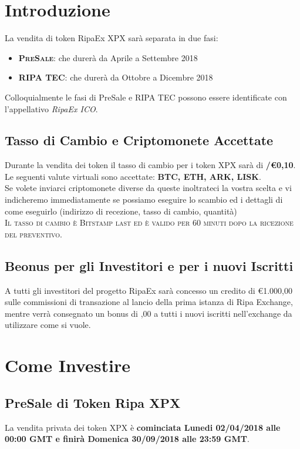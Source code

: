 \documentclass[11pt,fleqn]{book} %
\begin{document}
\section{Introduzione}
La vendita di token RipaEx XPX sarà separata in due fasi:
	\begin{itemize}
		\item \textbf{\textsc{PreSale}}: che durerà da Aprile a Settembre 2018
		\item \textbf{\textsc{RIPA TEC}}: che durerà da Ottobre a Dicembre 2018
	\end{itemize}
\vspace{5mm}
Colloquialmente le fasi di PreSale e RIPA TEC possono essere identificate con l'appellativo \textit{RipaEx ICO}.

\subsection{Tasso di Cambio e Criptomonete Accettate}
Durante la vendita dei token il tasso di cambio per i token XPX sarà di \textbf{\PHP/\euro0,10}.\\

Le seguenti valute virtuali sono accettate: \textbf{BTC, ETH, ARK, LISK}.\\

Se volete inviarci criptomonete diverse da queste inoltrateci la vostra scelta e vi indicheremo immediatamente
se possiamo eseguire lo scambio ed i dettagli di come eseguirlo (indirizzo di recezione, tasso di cambio,
quantità)\\

\textsc{Il tasso di cambio è Bitstamp last ed è valido per 60 minuti dopo la ricezione del preventivo}.

\subsection{Beonus per gli Investitori e per i nuovi Iscritti}
A tutti gli investitori del progetto RipaEx sarà concesso un credito di \euro1.000,00 sulle commissioni
di transazione al lancio della prima istanza di Ripa Exchange, mentre verrà consegnato un bonus di ,00
a tutti i nuovi iscritti nell'exchange da utilizzare come si vuole.


\section{Come Investire}
\subsection{PreSale di Token Ripa XPX}
La vendita privata dei token XPX è \textbf{cominciata Lunedi 02/04/2018 alle 00:00 GMT e finirà Domenica
30/09/2018 alle 23:59 GMT}.
\end{document}

